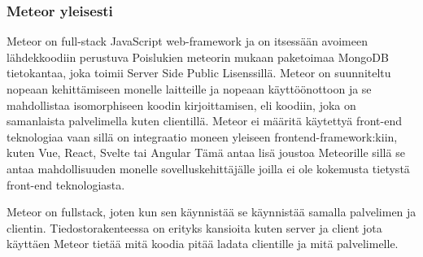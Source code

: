 



\subsubsection{Meteor yleisesti}











Meteor on full-stack JavaScript web-framework ja on itsessään avoimeen lähdekkoodiin perustuva 
Poislukien meteorin mukaan paketoimaa MongoDB tietokantaa, joka toimii Server Side Public Lisenssillä.
Meteor on suunniteltu nopeaan kehittämiseen monelle laitteille ja nopeaan käyttöönottoon ja se mahdollistaa isomorphiseen koodin kirjoittamisen, 
eli koodiin, joka on samanlaista palvelimella kuten clientillä. %
Meteor ei määritä käytettyä front-end teknologiaa vaan sillä on integraatio moneen yleiseen frontend-framework:kiin, kuten Vue, React, Svelte tai Angular 
Tämä antaa lisä joustoa Meteorille sillä se antaa mahdollisuuden monelle sovelluskehittäjälle joilla ei ole kokemusta tietystä front-end teknologiasta.
\medskip


%
Meteor on fullstack, joten kun sen käynnistää se käynnistää samalla palvelimen ja clientin.
Tiedostorakenteessa on erityks kansioita kuten server ja client jota käyttäen Meteor tietää mitä koodia pitää ladata clientille ja mitä palvelimelle.
\medskip



